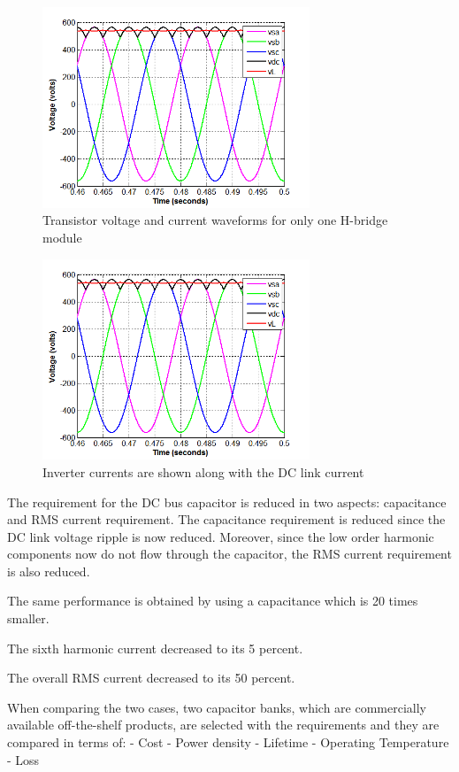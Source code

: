 \documentclass[conference,a4paper,twocolumn]{IEEEtran}
\begin{document}
\begin{figure}[h]
  \centering
  \includegraphics[width=8cm]{images/sample}
  \caption{Transistor voltage and current waveforms for only one H-bridge module}
  \label{fig:transistor_current}
\end{figure}

\begin{figure}[h]
  \centering
  \includegraphics[width=8cm]{images/sample}
  \caption{Inverter currents are shown along with the DC link current}
  \label{fig:inverter_current}
\end{figure}

The requirement for the DC bus capacitor is reduced in two aspects: capacitance and RMS current requirement. The capacitance requirement is reduced since the DC link voltage ripple is now reduced. Moreover, since the low order harmonic components now do not flow through the capacitor, the RMS current requirement is also reduced.

The same performance is obtained by using a capacitance which is 20 times smaller.

The sixth harmonic current decreased to its 5 percent.

The overall RMS current decreased to its 50 percent.

When comparing the two cases, two capacitor banks, which are commercially available off-the-shelf products, are selected with the requirements and they are compared in terms of:
- Cost
- Power density
- Lifetime
- Operating Temperature
- Loss
\end{document}
